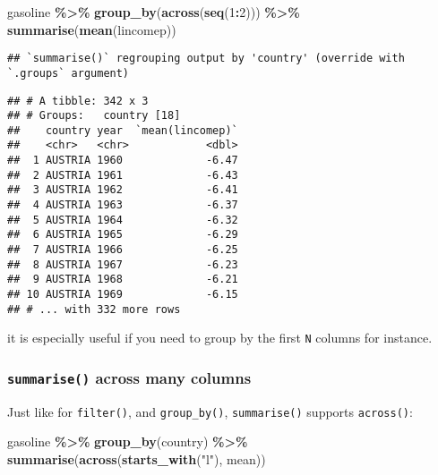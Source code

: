 \documentclass[
]{article}
\newenvironment{Shaded}{\begin{snugshade}}{\end{snugshade}}
\newcommand{\DecValTok}[1]{\textcolor[rgb]{0.00,0.00,0.81}{#1}}
\newcommand{\KeywordTok}[1]{\textcolor[rgb]{0.13,0.29,0.53}{\textbf{#1}}}
\newcommand{\NormalTok}[1]{#1}
\newcommand{\OperatorTok}[1]{\textcolor[rgb]{0.81,0.36,0.00}{\textbf{#1}}}
\newcommand{\StringTok}[1]{\textcolor[rgb]{0.31,0.60,0.02}{#1}}
\begin{document}
\begin{Shaded}
\begin{Highlighting}[]
\NormalTok{gasoline }\OperatorTok{\%\textgreater{}\%}
\StringTok{  }\KeywordTok{group\_by}\NormalTok{(}\KeywordTok{across}\NormalTok{(}\KeywordTok{seq}\NormalTok{(}\DecValTok{1}\OperatorTok{:}\DecValTok{2}\NormalTok{))) }\OperatorTok{\%\textgreater{}\%}
\StringTok{  }\KeywordTok{summarise}\NormalTok{(}\KeywordTok{mean}\NormalTok{(lincomep))}
\end{Highlighting}
\end{Shaded}

\begin{verbatim}
## `summarise()` regrouping output by 'country' (override with `.groups` argument)
\end{verbatim}

\begin{verbatim}
## # A tibble: 342 x 3
## # Groups:   country [18]
##    country year  `mean(lincomep)`
##    <chr>   <chr>            <dbl>
##  1 AUSTRIA 1960             -6.47
##  2 AUSTRIA 1961             -6.43
##  3 AUSTRIA 1962             -6.41
##  4 AUSTRIA 1963             -6.37
##  5 AUSTRIA 1964             -6.32
##  6 AUSTRIA 1965             -6.29
##  7 AUSTRIA 1966             -6.25
##  8 AUSTRIA 1967             -6.23
##  9 AUSTRIA 1968             -6.21
## 10 AUSTRIA 1969             -6.15
## # ... with 332 more rows
\end{verbatim}

it is especially useful if you need to group by the first \texttt{N} columns for instance.

\hypertarget{summarise-across-many-columns}{%
\subsubsection{\texorpdfstring{\texttt{summarise()} across many columns}{summarise() across many columns}}\label{summarise-across-many-columns}}

Just like for \texttt{filter()}, and \texttt{group\_by()}, \texttt{summarise()} supports \texttt{across()}:

\begin{Shaded}
\begin{Highlighting}[]
\NormalTok{gasoline }\OperatorTok{\%\textgreater{}\%}
\StringTok{  }\KeywordTok{group\_by}\NormalTok{(country) }\OperatorTok{\%\textgreater{}\%}
\StringTok{  }\KeywordTok{summarise}\NormalTok{(}\KeywordTok{across}\NormalTok{(}\KeywordTok{starts\_with}\NormalTok{(}\StringTok{"l"}\NormalTok{), mean))}
\end{Highlighting}
\end{Shaded}
\end{document}
